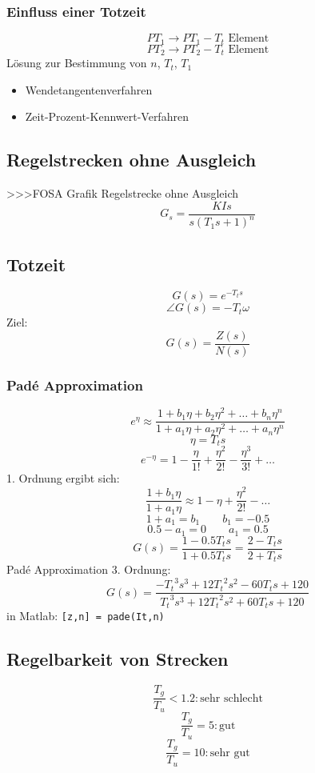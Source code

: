 \subsubsection{Einfluss einer Totzeit}
\[ PT_1 \rightarrow PT_1 - T_t \text{ Element} \]
\[ PT_2 \rightarrow PT_2 - T_t \text{ Element} \]
Lösung zur Bestimmung von $n$, $T_t$, $T_1$ 
\begin{itemize}
    \item Wendetangentenverfahren
    \item Zeit-Prozent-Kennwert-Verfahren
\end{itemize}

\subsection{Regelstrecken ohne Ausgleich}
>>>FOSA Grafik Regelstrecke ohne Ausgleich
\[ G_s = \frac{KIs}{s (T_1 s + 1)^n} \]

\subsection{Totzeit}
\[ G(s) = e^{-T_t s} \]
\[ \angle G(s) = -T_t \omega \]
Ziel: 
\[ G(s) = \frac{Z(s)}{N(s)} \]

\subsubsection{Padé Approximation}
\[ e^{\eta} \approx \frac{1 + b_1 \eta + b_2 \eta^2 + \ldots + b_n \eta^n}
{1 + a_1 \eta + a_2 \eta^2 + \ldots +  a_n \eta^n} \]
\[ \eta = T_t s \]
\[ e^{-\eta} = 1 - \frac{\eta}{1!} + \frac{\eta^2}{2!} - \frac{\eta^3}{3!} + \ldots \]
1. Ordnung ergibt sich: 
\[ \frac{1 + b_1 \eta}{1 + a_1 \eta} \approx 1 - \eta + \frac{\eta^2}{2!} - \ldots \]
\[ 1 + a_1 = b_1 \qquad b_1 = -0.5 \]
\[ 0.5 - a_1 = 0 \qquad a_1 = 0.5 \]
\[ G(s)  = \frac{1 - 0.5 T_t s}{1 + 0.5 T_t s} = \frac{2 - T_t s}{2 + T_t s} \]
Padé Approximation 3. Ordnung: 
\[ G(s) = \frac{-{T_t}^3 s^3 + 12 {T_t}^2 s^2 - 60 T_t s + 120}
{{T_t}^3 s^3 + 12 {T_t}^2 s^2 + 60 T_t s + 120} \]
in Matlab: \verb?[z,n] = pade(It,n)?

\subsection{Regelbarkeit von Strecken}
\[ \frac{T_g}{T_u} < 1.2: \text{sehr schlecht} \]
\[ \frac{T_g}{T_u} = 5: \text{gut} \]
\[ \frac{T_g}{T_u} = 10: \text{sehr gut} \]

